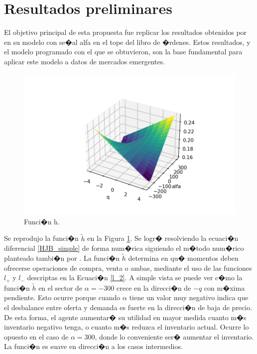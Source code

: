 \documentclass[12pt,a4paper,spanish]{article}%
\begin{document}
\section {Resultados preliminares} \label{sec:resultados}

El objetivo principal de esta propuesta fue replicar los resultados obtenidos por \cite{Cartea2019} en su modelo con se�al alfa en el tope del libro de �rdenes. Estos resultados, y el modelo programado con el que se obtuvieron, son la base fundamental para aplicar este modelo a datos de mercados emergentes.

\begin{figure}[H]
	\centering
	\includegraphics[width=0.95\linewidth]{figuras/h_final}
	\caption{Funci�n h.}
	\label{fig:h}
\end{figure}

Se reprodujo la funci�n $\tilde{h}$ en la Figura \ref{fig:h}. Se logr� resolviendo la ecuaci�n diferencial \ref{HJB_simple} de forma num�rica siguiendo el m�todo num�rico planteado tambi�n por \cite{Cartea2019}. La funci�n $\tilde{h}$ determina en qu� momentos deben ofrecerse operaciones de compra, venta o ambas, mediante el uso de las funciones $l_+$ y $l_-$ descriptas en la Ecuaci�n \ref{l_2}. A simple vista se puede ver c�mo la funci�n $\tilde{h}$ en el sector de $\alpha=-300$ crece en la direcci�n de $-q$ con m�xima pendiente. Esto ocurre porque cuando $\alpha$ tiene un valor muy negativo indica que el desbalance entre oferta y demanda es fuerte en la direcci�n de baja de precio. De esta forma, el agente aumentar� su utilidad en mayor medida cuanto m�s inventario negativo tenga, o cuanto m�s reduzca el inventario actual. Ocurre lo opuesto en el caso de $\alpha=300$, donde lo conveniente ser� aumentar el inventario. La funci�n es suave en direcci�n a los casos intermedios.
\end{document}
